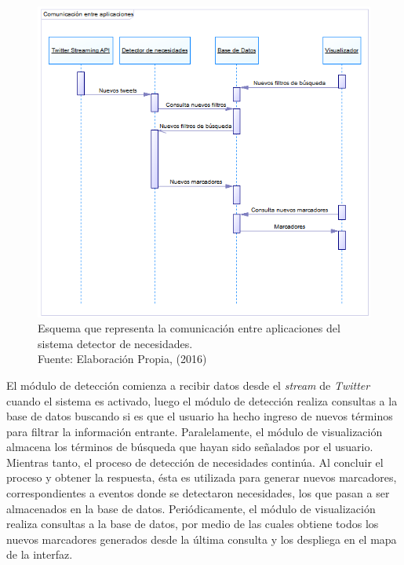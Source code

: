 \begin{figure}[H]
	\centering
	\captionsetup{justification=centering}
	\includegraphics[scale=0.8]{images/ComunicacionFinal.png}
	\caption[Esquema que representa la comunicación entre aplicaciones del sistema detector de necesidades.]{Esquema que representa la comunicación entre aplicaciones del sistema detector de necesidades.\\Fuente: Elaboración Propia, (2016)}
	\label{fig:comunFinal}
\end{figure}

El módulo de detección comienza a recibir datos desde el \textit{stream} de \textit{Twitter} cuando el sistema es activado, luego el módulo de detección realiza consultas a la base de datos buscando si es que el usuario ha hecho ingreso de nuevos términos para filtrar la información entrante. Paralelamente, el módulo de visualización almacena los términos de búsqueda que hayan sido señalados por el usuario. Mientras tanto, el proceso de detección de necesidades continúa. Al concluir el proceso y obtener la respuesta, ésta es utilizada para generar nuevos marcadores, correspondientes a eventos donde se detectaron necesidades, los que pasan a ser almacenados en la base de datos. Periódicamente, el módulo de visualización realiza consultas a la base de datos, por medio de las cuales obtiene todos los nuevos marcadores generados desde la última consulta y los despliega en el mapa de la interfaz.


